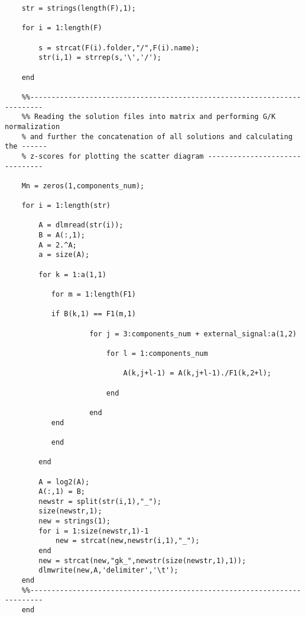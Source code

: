 \documentclass{article}
\begin{document}
\begin{verbatim}
    str = strings(length(F),1);
    
    for i = 1:length(F)
        
        s = strcat(F(i).folder,"/",F(i).name);
        str(i,1) = strrep(s,'\','/');
        
    end
    
    %%-------------------------------------------------------------------------
    %% Reading the solution files into matrix and performing G/K normalization 
    % and further the concatenation of all solutions and calculating the ------
    % z-scores for plotting the scatter diagram -------------------------------
    
    Mn = zeros(1,components_num);
    
    for i = 1:length(str)
        
        A = dlmread(str(i));
        B = A(:,1);
        A = 2.^A;
        a = size(A);
        
        for k = 1:a(1,1)
            
           for m = 1:length(F1)
               
           if B(k,1) == F1(m,1)
    
                    for j = 3:components_num + external_signal:a(1,2)
                        
                        for l = 1:components_num
                   
                            A(k,j+l-1) = A(k,j+l-1)./F1(k,2+l);
                            
                        end
                   
                    end
           end
    
           end
           
        end
        
        A = log2(A);
        A(:,1) = B;
        newstr = split(str(i,1),"_");
        size(newstr,1);
        new = strings(1);
        for i = 1:size(newstr,1)-1
            new = strcat(new,newstr(i,1),"_");
        end
        new = strcat(new,"gk_",newstr(size(newstr,1),1));
        dlmwrite(new,A,'delimiter','\t');
    end
    %%-------------------------------------------------------------------------
    end
\end{verbatim}
\end{document}
